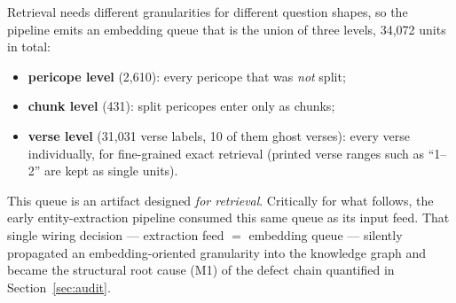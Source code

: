 Retrieval needs different granularities for different question shapes, so
the pipeline emits an embedding queue that is the union of three levels,
34{,}072 units in total:

\begin{itemize}
\item \textbf{pericope level} (2{,}610): every pericope that was
\emph{not} split;
\item \textbf{chunk level} (431): split pericopes enter only as chunks;
\item \textbf{verse level} (31{,}031 verse labels, 10 of them ghost
verses): every verse individually, for
fine-grained exact retrieval (printed verse ranges such as ``1--2'' are
kept as single units).
\end{itemize}

This queue is an artifact designed \emph{for retrieval}. Critically for
what follows, the early entity-extraction pipeline consumed this same
queue as its input feed. That single wiring decision --- extraction feed
$=$ embedding queue --- silently propagated an embedding-oriented
granularity into the knowledge graph and became the structural root cause
(M1) of the defect chain quantified in Section~\ref{sec:audit}.
